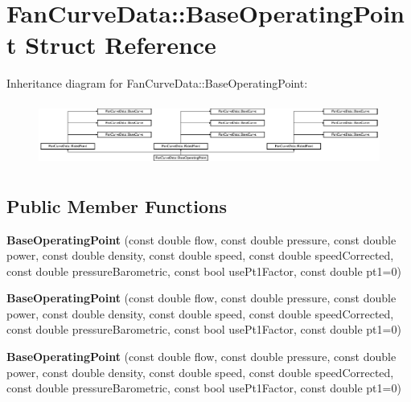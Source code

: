 \hypertarget{struct_fan_curve_data_1_1_base_operating_point}{}\section{Fan\+Curve\+Data\+:\+:Base\+Operating\+Point Struct Reference}
\label{struct_fan_curve_data_1_1_base_operating_point}
Inheritance diagram for Fan\+Curve\+Data\+:\+:Base\+Operating\+Point\+:\begin{figure}[H]
\begin{center}
\leavevmode
\includegraphics[height=2.111614cm]{d2/da0/struct_fan_curve_data_1_1_base_operating_point}
\end{center}
\end{figure}
\subsection*{Public Member Functions}
\begin{DoxyCompactItemize}
\item 
\mbox{\label{struct_fan_curve_data_1_1_base_operating_point_a0260135ed464bc91143c620a1eeed78d}} 
{\bfseries Base\+Operating\+Point} (const double flow, const double pressure, const double power, const double density, const double speed, const double speed\+Corrected, const double pressure\+Barometric, const bool use\+Pt1\+Factor, const double pt1=0)
\item 
\mbox{\label{struct_fan_curve_data_1_1_base_operating_point_a0260135ed464bc91143c620a1eeed78d}} 
{\bfseries Base\+Operating\+Point} (const double flow, const double pressure, const double power, const double density, const double speed, const double speed\+Corrected, const double pressure\+Barometric, const bool use\+Pt1\+Factor, const double pt1=0)
\item 
\mbox{\label{struct_fan_curve_data_1_1_base_operating_point_a0260135ed464bc91143c620a1eeed78d}} 
{\bfseries Base\+Operating\+Point} (const double flow, const double pressure, const double power, const double density, const double speed, const double speed\+Corrected, const double pressure\+Barometric, const bool use\+Pt1\+Factor, const double pt1=0)
\end{DoxyCompactItemize}
